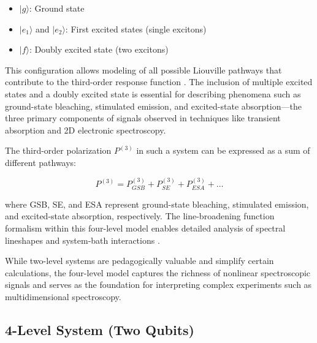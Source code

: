 \begin{itemize}
	\item $|g\rangle$: Ground state
	\item $|e_1\rangle$ and $|e_2\rangle$: First excited states (single excitons)
	\item $|f\rangle$: Doubly excited state (two excitons)
\end{itemize}

\noindent This configuration allows modeling of all possible Liouville pathways that contribute to the third-order response function \cite{mukamel1995principlesnonlinearoptical}. The inclusion of multiple excited states and a doubly excited state is essential for describing phenomena such as ground-state bleaching, stimulated emission, and excited-state absorption—the three primary components of signals observed in techniques like transient absorption and 2D electronic spectroscopy.

\noindent The third-order polarization $P^{(3)}$ in such a system can be expressed as a sum of different pathways:

\begin{equation}
	P^{(3)} = P^{(3)}_{GSB} + P^{(3)}_{SE} + P^{(3)}_{ESA} + \ldots
	\label{eq:third_order_contributions}
\end{equation}

\noindent where GSB, SE, and ESA represent ground-state bleaching, stimulated emission, and excited-state absorption, respectively. The line-broadening function formalism within this four-level model enables detailed analysis of spectral lineshapes and system-bath interactions \cite{cho2009twodimensionalopticalspectroscopy, abramaviciusetal2009coherentmultidimensionaloptical}.

\noindent While two-level systems are pedagogically valuable and simplify certain calculations, the four-level model captures the richness of nonlinear spectroscopic signals and serves as the foundation for interpreting complex experiments such as multidimensional spectroscopy.


\subsection{4-Level System (Two Qubits)}

